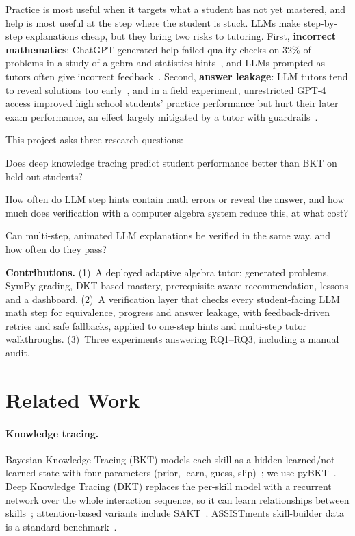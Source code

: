 \documentclass[11pt]{article}
\begin{document}
Practice is most useful when it targets what a student has not yet mastered, and help is most useful at the step where the student is stuck. LLMs make step-by-step explanations cheap, but they bring two risks to tutoring. First, \textbf{incorrect mathematics}: ChatGPT-generated help failed quality checks on 32\% of problems in a study of algebra and statistics hints~\cite{pardos2024chatgpt}, and LLMs prompted as tutors often give incorrect feedback~\cite{macina2023mathdial}. Second, \textbf{answer leakage}: LLM tutors tend to reveal solutions too early~\cite{macina2023mathdial}, and in a field experiment, unrestricted GPT-4 access improved high school students' practice performance but hurt their later exam performance, an effect largely mitigated by a tutor with guardrails~\cite{bastani2025harm}.

\noindent This project asks three research questions:
\begin{description}[leftmargin=2.8em,style=sameline]
  \item[RQ1] Does deep knowledge tracing predict student performance better than BKT on held-out students?
  \item[RQ2] How often do LLM step hints contain math errors or reveal the answer, and how much does verification with a computer algebra system reduce this, at what cost?
  \item[RQ3] Can multi-step, animated LLM explanations be verified in the same way, and how often do they pass?
\end{description}

\noindent\textbf{Contributions.} (1)~A deployed adaptive algebra tutor: generated problems, SymPy grading, DKT-based mastery, prerequisite-aware recommendation, lessons and a dashboard. (2)~A verification layer that checks every student-facing LLM math step for equivalence, progress and answer leakage, with feedback-driven retries and safe fallbacks, applied to one-step hints and multi-step tutor walkthroughs. (3)~Three experiments answering RQ1--RQ3, including a manual audit.

\section{Related Work}
\paragraph{Knowledge tracing.} Bayesian Knowledge Tracing (BKT) models each skill as a hidden learned/not-learned state with four parameters (prior, learn, guess, slip)~\cite{corbett1995knowledge}; we use pyBKT~\cite{badrinath2021pybkt}. Deep Knowledge Tracing (DKT) replaces the per-skill model with a recurrent network over the whole interaction sequence, so it can learn relationships between skills~\cite{piech2015deep}; attention-based variants include SAKT~\cite{pandey2019sakt}. ASSISTments skill-builder data is a standard benchmark~\cite{feng2009assistments}.
\end{document}
